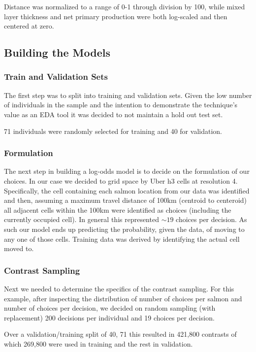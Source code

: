 \documentclass[11pt]{article}
\begin{document}
Distance was normalized to a range of 0-1 through division by 100, while mixed layer thickness and net primary production were both log-scaled and then centered at zero. 

\subsection*{Building the Models}

\subsubsection*{Train and Validation Sets} 

The first step was to split into training and validation sets. Given the low number of individuals in the sample and the intention to demonstrate the technique's value as an EDA tool it was decided to not maintain a hold out test set.

71 individuals were randomly selected for training and 40 for validation.

\subsubsection*{Formulation}

The next step in building a log-odds model is to decide on the formulation of our choices. In our case we decided to grid space by Uber h3 cells at resolution 4. Specifically, the cell containing each salmon location from our data was identified and then, assuming a maximum travel distance of 100km (centroid to centeroid) all adjacent cells within the 100km were identified as choices (including the currently occupied cell). In general this represented $\sim 19$ choices per decision. As such our model ends up predicting the probability, given the data, of moving to any one of those cells. Training data was derived by identifying the actual cell moved to. 

\subsubsection*{Contrast Sampling}

Next we needed to determine the specifics of the contrast sampling. For this example, after inspecting the distribution of number of choices per salmon and number of choices per decision, we decided on random sampling (with replacement) 200 decisions per individual and 19 choices per decision. 

Over a validation/training split of 40, 71 this resulted in 421,800 contrasts of which 269,800 were used in training and the rest in validation. 
\end{document}
